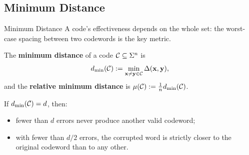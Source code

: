 \documentclass{zkdl-presentation-template}
\begin{document}
    \subsection{Minimum Distance}

    \begin{frame}{Minimum Distance}
        A code's effectiveness depends on the whole set: the worst-case spacing between two codewords is the key metric.

        \begin{definition}
            The \textbf{minimum distance} of a code $\mathcal{C} \subseteq \Sigma^n$ is
            \begin{equation*}
                d_{\min}(\mathcal{C}) := \min_{\mathbf{x}\neq \mathbf{y} \in \mathcal{C}} \Delta(\mathbf{x}, \mathbf{y}),
            \end{equation*}
            and the \textbf{relative minimum distance} is $\mu(\mathcal{C}) := \frac{1}{n} d_{\min}(\mathcal{C})$.
        \end{definition}
        \pause

        If $d_{\min}(\mathcal{C}) = d$, then:
        \begin{itemize}
            \item fewer than $d$ errors never produce another valid codeword;\pause
            \item with fewer than $d/2$ errors, the corrupted word is strictly closer to the original codeword than to any other.
        \end{itemize}
    \end{frame}
\end{document}
